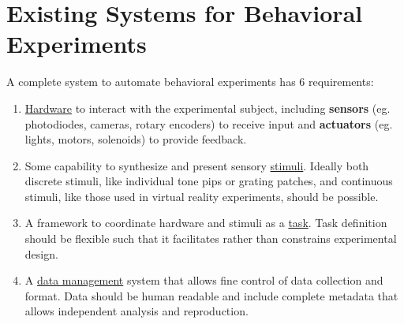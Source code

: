 
\section{Existing Systems for Behavioral Experiments}
\label{sec:existing}

A complete system to automate behavioral experiments has 6 requirements:

\begin{enumerate}

\item \hyperref[sec:hardware]{Hardware} to interact with the experimental subject, including \textbf{sensors} (eg. photodiodes, cameras, rotary encoders) to receive input and \textbf{actuators} (eg. lights, motors, solenoids) to provide feedback.
\item Some capability to synthesize and present sensory \hyperref[sec:stim]{stimuli}. Ideally both discrete stimuli, like individual tone pips or grating patches, and continuous stimuli, like those used in virtual reality experiments, should be possible.
\item A  framework to coordinate hardware and stimuli as a \hyperref[sec:tasks]{task}. Task definition should be flexible such that it facilitates rather than constrains experimental design.
\item A \hyperref[sec:data]{data management} system that allows fine control of data collection and format. Data should be human readable and include complete metadata that allows independent analysis and reproduction.

\end{enumerate}
